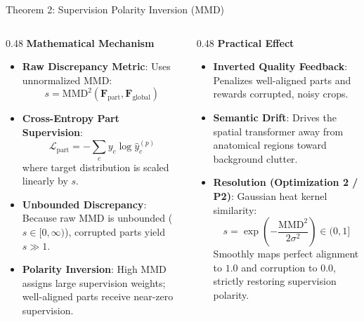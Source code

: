 \documentclass[aspectratio=169,xcolor=dvipsnames]{beamer}
\begin{document}
\begin{frame}{Theorem 2: Supervision Polarity Inversion (MMD)}
\footnotesize
\setlength{\abovedisplayskip}{4pt}
\setlength{\belowdisplayskip}{4pt}
\begin{columns}[t,onlytextwidth]
\begin{column}{0.48\textwidth}
    \textbf{Mathematical Mechanism}
    \begin{itemize}
        \setlength{\itemsep}{0.10em}
        \item \textbf{Raw Discrepancy Metric}: Uses unnormalized MMD:
        $$s = \mathrm{MMD}^2(\mathbf{F}_{\text{part}}, \mathbf{F}_{\text{global}})$$
        \item \textbf{Cross-Entropy Part Supervision}:
        $$\mathcal{L}_{\text{part}} = - \sum_c y_c \log \hat{y}_c^{(p)}$$
        where target distribution is scaled linearly by $s$.
        \item \textbf{Unbounded Discrepancy}: Because raw MMD is unbounded ($s \in [0, \infty)$), corrupted parts yield $s \gg 1$.
        \item \textbf{Polarity Inversion}: High MMD assigns large supervision weights; well-aligned parts receive near-zero supervision.
    \end{itemize}
\end{column}
\begin{column}{0.48\textwidth}
    \textbf{Practical Effect}
    \begin{itemize}
        \setlength{\itemsep}{0.10em}
        \item \textbf{Inverted Quality Feedback}: Penalizes well-aligned parts and rewards corrupted, noisy crops.
        \item \textbf{Semantic Drift}: Drives the spatial transformer away from anatomical regions toward background clutter.
        \item \textbf{Resolution (Optimization 2 / P2)}: Gaussian heat kernel similarity:
        $$s = \exp\left(-\frac{\mathrm{MMD}^2}{2\sigma^2}\right) \in (0, 1]$$
        Smoothly maps perfect alignment to $1.0$ and corruption to $0.0$, strictly restoring supervision polarity.
    \end{itemize}
\end{column}
\end{columns}
\end{frame}
\end{document}
